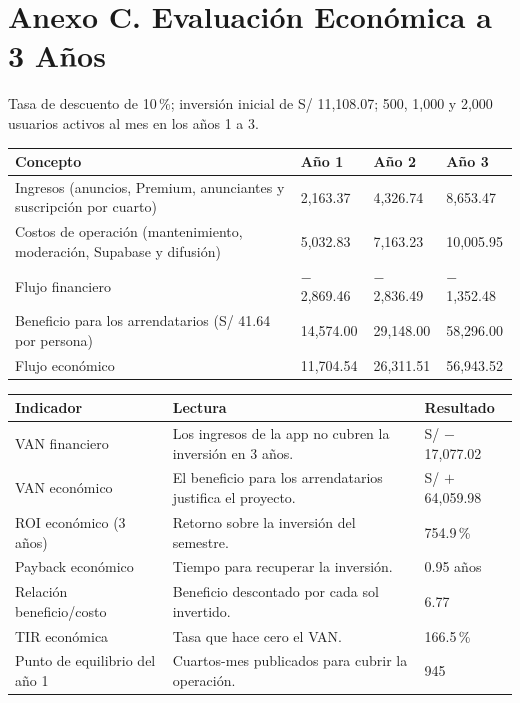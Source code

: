 \documentclass[11pt,a4paper]{article}
\begin{document}
\section*{\textcolor{AzulUNA}{Anexo C. Evaluación Económica a 3 Años}}
Tasa de descuento de 10\,\%; inversión inicial de S/ 11,108.07; 500, 1,000 y 2,000 usuarios activos al mes en los años 1 a 3.

\vspace{0.1cm}
{\small
{}
\noindent\begin{tabularx}{\textwidth}{@{}L Q{1.7cm} Q{1.7cm} Q{1.7cm}@{}}
\toprule
{}
\textbf{Concepto} & \textbf{Año 1} & \textbf{Año 2} & \textbf{Año 3} \\
\midrule
Ingresos (anuncios, Premium, anunciantes y suscripción por cuarto) & 2,163.37 & 4,326.74 & 8,653.47 \\
Costos de operación (mantenimiento, moderación, Supabase y difusión) & 5,032.83 & 7,163.23 & 10,005.95 \\
Flujo financiero & $-$2,869.46 & $-$2,836.49 & $-$1,352.48 \\
Beneficio para los arrendatarios (S/ 41.64 por persona) & 14,574.00 & 29,148.00 & 58,296.00 \\
Flujo económico & 11,704.54 & 26,311.51 & 56,943.52 \\
\bottomrule
\end{tabularx}
}

\vspace{0.15cm}
{\small
{}
\noindent\begin{tabularx}{\textwidth}{@{}P{4.4cm} L Q{3.0cm}@{}}
\toprule
{}
\textbf{Indicador} & \textbf{Lectura} & \textbf{Resultado} \\
\midrule
VAN financiero & Los ingresos de la app no cubren la inversión en 3 años. & S/ $-$17,077.02 \\
VAN económico & El beneficio para los arrendatarios justifica el proyecto. & S/ $+$64,059.98 \\
ROI económico (3 años) & Retorno sobre la inversión del semestre. & 754.9\,\% \\
Payback económico & Tiempo para recuperar la inversión. & 0.95 años \\
Relación beneficio/costo & Beneficio descontado por cada sol invertido. & 6.77 \\
TIR económica & Tasa que hace cero el VAN. & 166.5\,\% \\
Punto de equilibrio del año 1 & Cuartos-mes publicados para cubrir la operación. & 945 \\
\bottomrule
\end{tabularx}
}
\end{document}
